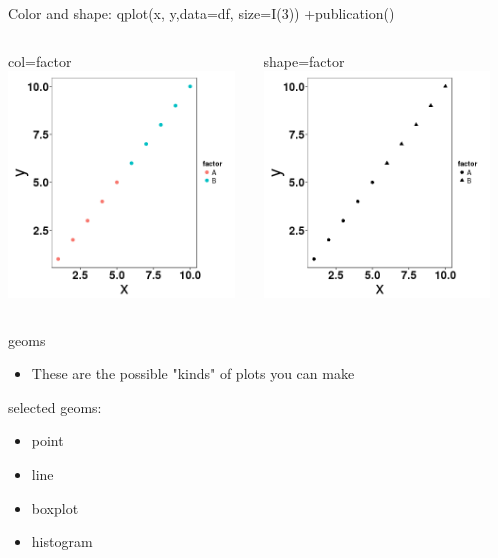 \documentclass[t,10pt]{beamer}
\begin{document}
\begin{frame}[label={sec:orgheadline11}]{Color and shape: qplot(x, y,data=df, size=I(3)) +publication()}
\begin{columns}
\begin{column}{0.5\columnwidth}
\begin{block}{col=factor}
\includegraphics[width=6cm,height=6cm]{./plot_col.png}
\end{block}
\end{column}

\begin{column}{0.5\columnwidth}
\begin{block}{shape=factor}
\includegraphics[width=6cm,height=6cm]{./plot_shape.png}
\end{block}
\end{column}
\end{columns}
\end{frame}

\begin{frame}[label={sec:orgheadline12}]{geoms}
\begin{itemize}
\item These are the possible "kinds" of plots you can make
\end{itemize}
selected geoms:
\begin{itemize}
\item point
\item line
\item boxplot
\item histogram
\end{itemize}
\end{frame}
\end{document}

